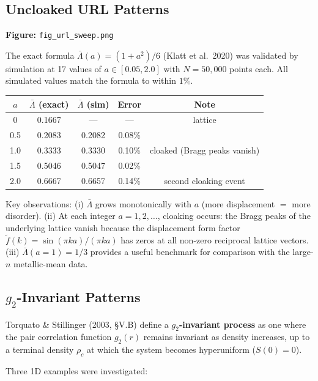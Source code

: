 \documentclass[11pt,letterpaper]{article}
\begin{document}
\subsection{Uncloaked URL Patterns}

\textbf{Figure:} \texttt{fig\_url\_sweep.png}

The exact formula $\bar\Lambda(a) = (1+a^2)/6$ (Klatt et al.\ 2020) was validated
by simulation at 17 values of $a \in [0.05, 2.0]$ with $N = 50{,}000$ points each.
All simulated values match the formula to within $1\%$.

\medskip
\noindent\begin{tabular}{ccccc}
\toprule
$a$ & $\bar\Lambda$ (exact) & $\bar\Lambda$ (sim) & Error & Note \\
\midrule
0    & 0.1667 & ---    & ---     & lattice \\
0.5  & 0.2083 & 0.2082 & 0.08\% & \\
1.0  & 0.3333 & 0.3330 & 0.10\% & cloaked (Bragg peaks vanish) \\
1.5  & 0.5046 & 0.5047 & 0.02\% & \\
2.0  & 0.6667 & 0.6657 & 0.14\% & second cloaking event \\
\bottomrule
\end{tabular}

\medskip\noindent
Key observations: (i) $\bar\Lambda$ grows monotonically with $a$ (more displacement
$=$ more disorder). (ii) At each integer $a = 1, 2, \ldots$, cloaking occurs: the
Bragg peaks of the underlying lattice vanish because the displacement form factor
$\tilde f(k) = \sin(\pi k a)/(\pi k a)$ has zeros at all non-zero reciprocal lattice
vectors. (iii) $\bar\Lambda(a=1) = 1/3$ provides a useful benchmark for comparison with
the large-$n$ metallic-mean data.

\subsection{$g_2$-Invariant Patterns}

Torquato \& Stillinger (2003, §V.B) define a \textbf{$g_2$-invariant process}
as one where the pair correlation function $g_2(r)$ remains invariant as
density increases, up to a terminal density $\rho_c$ at which the system
becomes hyperuniform ($S(0) = 0$).

Three 1D examples were investigated:
\end{document}
